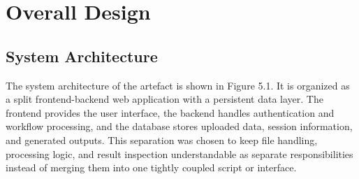 



\section{Overall Design}

\subsection{System Architecture}

The system architecture of the artefact is shown in Figure 5.1. It is organized as a split frontend-backend web application with a persistent data layer. The frontend provides the user interface, the backend handles authentication and workflow processing, and the database stores uploaded data, session information, and generated outputs. This separation was chosen to keep file handling, processing logic, and result inspection understandable as separate responsibilities instead of merging them into one tightly coupled script or interface.

